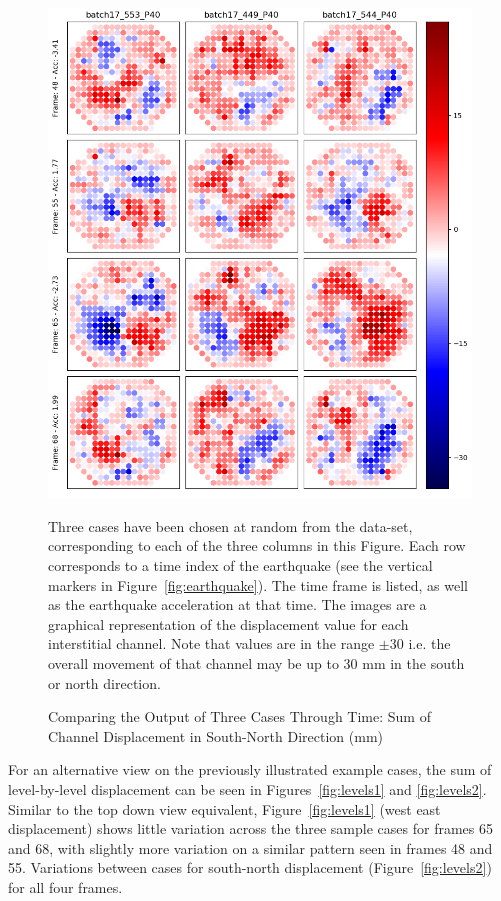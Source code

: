 \begin{figure}[p]
	\centering
	\includegraphics[scale=0.45]{Figures/results2.png}
	\caption{Comparing the Output of Three Cases Through Time: Sum of Channel Displacement in South-North Direction (mm) } {Three cases have been chosen at random from the data-set, corresponding to each of the three columns in this Figure. Each row corresponds to a time index of the earthquake (see the vertical markers in Figure~\ref{fig:earthquake}). The time frame is listed, as well as the earthquake acceleration at that time. The images are a graphical representation of the displacement value for each interstitial channel. Note that values are in the range $ \pm 30 $ i.e. the overall movement of that channel may be up to 30 mm in the south or north direction.}
	\label{fig:results2}
\end{figure}

\noindent
For an alternative view on the previously illustrated example cases, the sum of level-by-level displacement can be seen in Figures~\ref{fig:levels1} and \ref{fig:levels2}. Similar to the top down view equivalent, Figure~\ref{fig:levels1} (west east displacement) shows little variation across the three sample cases for frames 65 and 68, with slightly more variation on a similar pattern seen in frames 48 and 55. Variations between cases for south-north displacement (Figure~\ref{fig:levels2}) for all four frames.
\\

